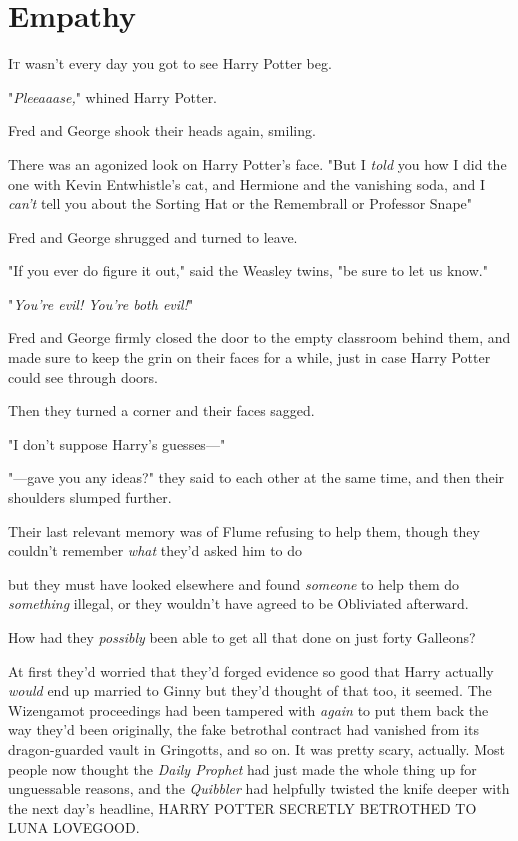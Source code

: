 \chapter{Empathy}

\lettrine{I}{t} wasn't every day you got to see Harry Potter beg.

"\emph{Pleeaaase,}" whined Harry Potter.

Fred and George shook their heads again, smiling.

There was an agonized look on Harry Potter's face. "But I \emph{told} you how I
did the one with Kevin Entwhistle's cat, and Hermione and the vanishing soda,
and I \emph{can't} tell you about the Sorting Hat or the Remembrall or
Professor Snape{\el}"

Fred and George shrugged and turned to leave.

"If you ever do figure it out," said the Weasley twins, "be sure to let us
know."

"\emph{You're evil! You're both evil!}"

Fred and George firmly closed the door to the empty classroom behind them, and
made sure to keep the grin on their faces for a while, just in case Harry
Potter could see through doors.

Then they turned a corner and their faces sagged.

"I don't suppose Harry's guesses\mbox{---}"

"---gave you any ideas?" they said to each other at the same time, and then
their shoulders slumped further.

Their last relevant memory was of Flume refusing to help them, though they
couldn't remember \emph{what} they'd asked him to do{\el}

{\el} but they must have looked elsewhere and found \emph{someone} to help
them do \emph{something} illegal, or they wouldn't have agreed to be Obliviated
afterward.

How had they \emph{possibly} been able to get all that done on just forty
Galleons?

At first they'd worried that they'd forged evidence so good that Harry actually
\emph{would} end up married to Ginny{\el} but they'd thought of that too, it
seemed. The Wizengamot proceedings had been tampered with \emph{again} to put
them back the way they'd been originally, the fake betrothal contract had
vanished from its dragon-guarded vault in Gringotts, and so on. It was pretty
scary, actually. Most people now thought the \emph{Daily Prophet} had just made
the whole thing up for unguessable reasons, and the \emph{Quibbler} had
helpfully twisted the knife deeper with the next day's headline, HARRY POTTER
SECRETLY BETROTHED TO LUNA LOVEGOOD.

